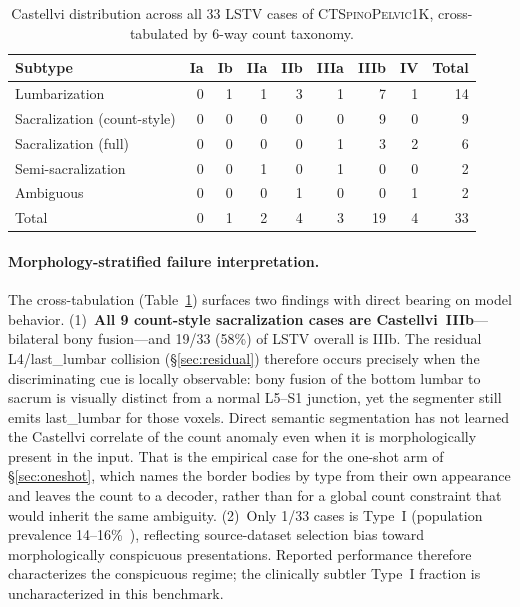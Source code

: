 \documentclass{article}
\newcommand{\dataset}{\textsc{CTSpinoPelvic1K}}
\begin{document}
\begin{table}[h]
\caption{Castellvi distribution across all 33 LSTV cases
of \dataset{}, cross-tabulated by 6-way count taxonomy.}
\label{tab:castellvi_dist}
\centering
\small
\setlength{\tabcolsep}{4pt}
\begin{tabular}{lrrrrrrrr}
\toprule
\bfseries Subtype & \bfseries Ia & \bfseries Ib & \bfseries IIa & \bfseries IIb & \bfseries IIIa & \bfseries IIIb & \bfseries IV & \bfseries Total \\
\midrule
Lumbarization                  & 0 & 1 & 1 & 3 & 1 & 7 & 1 & 14 \\
Sacralization (count-style)    & 0 & 0 & 0 & 0 & 0 & 9 & 0 & 9 \\
Sacralization (full)           & 0 & 0 & 0 & 0 & 1 & 3 & 2 & 6 \\
Semi-sacralization             & 0 & 0 & 1 & 0 & 1 & 0 & 0 & 2 \\
Ambiguous                      & 0 & 0 & 0 & 1 & 0 & 0 & 1 & 2 \\
\midrule
Total                          & 0 & 1 & 2 & 4 & 3 & 19 & 4 & 33 \\
\bottomrule
\end{tabular}
\end{table}

\paragraph{Morphology-stratified failure interpretation.}
The cross-tabulation (Table~\ref{tab:castellvi_dist})
surfaces two findings with direct bearing on model
behavior. (1)~\textbf{All 9 count-style sacralization
cases are Castellvi~IIIb}---bilateral bony fusion---and
19/33 (58\%) of LSTV overall is IIIb. The residual
L4/last\_lumbar collision (\S\ref{sec:residual})
therefore occurs precisely when the discriminating cue
is locally observable: bony fusion of the bottom lumbar
to sacrum is visually distinct from a normal L5--S1
junction, yet the segmenter still emits last\_lumbar
for those voxels. Direct semantic segmentation has not
learned the Castellvi correlate of the count anomaly
even when it is morphologically present in the input.
That is the empirical case for the one-shot arm of
\S\ref{sec:oneshot}, which names the border bodies by
type from their own appearance and leaves the count to a
decoder, rather than for a global count constraint that
would inherit the same ambiguity. (2)~Only 1/33 cases is Type~I
(population prevalence
14--16\%~\citep{Sekharappa2014LumbosacralSignificance}),
reflecting source-dataset selection bias toward
morphologically conspicuous presentations. Reported
performance therefore characterizes the conspicuous
regime; the clinically subtler Type~I fraction is
uncharacterized in this benchmark.
\end{document}
